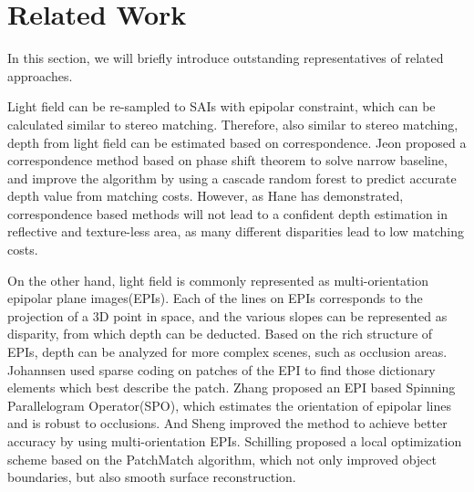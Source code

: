 \documentclass[10pt,twocolumn,letterpaper]{article}
\begin{document}
\section{Related Work}

In this section, we will briefly introduce outstanding representatives of related approaches.

Light field can be re-sampled to SAIs with epipolar constraint, which can be calculated similar to stereo matching\cite{jeon2015accurate}. Therefore, also similar to stereo matching, depth from light field can be estimated based on correspondence. Jeon \etal\cite{jeon2015accurate} proposed a correspondence method based on phase shift theorem to solve narrow baseline, and improve the algorithm by using a cascade random forest to predict accurate depth value from matching costs\cite{jeon2018depth}. However, as Hane \etal\cite{hane2015direction} has demonstrated, correspondence based methods will not lead to a confident depth estimation in reflective and texture-less area, as many different disparities lead to low matching costs.

On the other hand, light field is commonly represented as multi-orientation epipolar plane images(EPIs)\cite{bolles1987epipolar}. Each of the lines on EPIs corresponds to the projection of a 3D point in space, and the various slopes can be represented as disparity, from which depth can be deducted. Based on the rich structure of EPIs, depth can be analyzed for more complex scenes, such as occlusion areas\cite{wanner2013reconstructing, johannsen2016sparse, wanner2013reconstructing}. Johannsen \etal\cite{johannsen2016sparse} used sparse coding on patches of the EPI to find those dictionary elements which best describe the patch. Zhang \etal\cite{zhang2016robust} proposed an EPI based Spinning Parallelogram Operator(SPO), which estimates the orientation of epipolar lines and is robust to occlusions. And Sheng \etal\cite{sheng2018occlusion} improved the method to achieve better accuracy by using multi-orientation EPIs. Schilling\cite{schilling2018trust} proposed a local optimization scheme based on the PatchMatch algorithm, which not only improved object boundaries, but also smooth surface reconstruction. 
\end{document}
